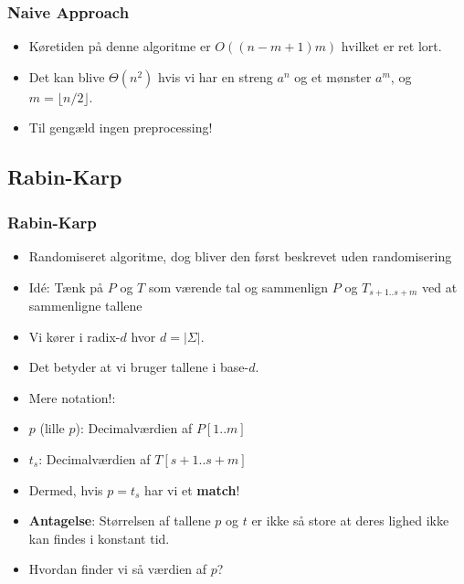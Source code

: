 \documentclass{beamer}
\begin{document}
\begin{frame}[allowframebreaks]
  \frametitle{Naive Approach}
  \begin{itemize}
  \item Køretiden på denne algoritme er $O((n-m+1)m)$ hvilket er ret lort. 
  \item Det kan blive $\Theta (n^{2})$ hvis vi har en streng $a^{n}$ og et mønster $a^{m}$, og $m = \lfloor n / 2 \rfloor$. 
  \item Til gengæld ingen preprocessing!
  \end{itemize}
\end{frame}

\subsection{Rabin-Karp}
\label{subsec:label}



\begin{frame}[allowframebreaks]
  \frametitle{Rabin-Karp}
  \begin{itemize}
    \item Randomiseret algoritme, dog bliver den først beskrevet uden randomisering
    \item Idé: Tænk på $P$ og $T$ som værende tal og sammenlign $P$ og $T_{s+1..s+m}$ ved at sammenligne tallene
    \item Vi kører i radix-$d$ hvor $d = |\Sigma|$. 
    \item Det betyder at vi bruger tallene i base-$d$.
    \item Mere notation!:
    \item $p$ (lille $p$): Decimalværdien af $P[1..m]$
    \item $t_{s}$: Decimalværdien af $T[s+1..s+m]$
    \item Dermed, hvis $p = t_{s}$ har vi et \textbf{match}!
    \item \textbf{Antagelse}: Størrelsen af tallene $p$ og $t$ er ikke så store at deres lighed ikke kan findes i konstant tid.
    \item Hvordan finder vi så værdien af $p$?
  \end{itemize}
\end{frame}
\end{document}
